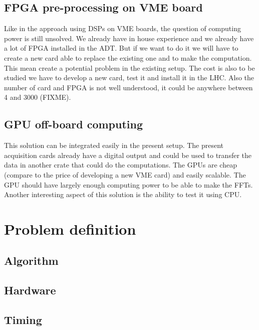 \subsection{FPGA pre-processing on VME board}

Like in the approach using \glspl{DSP} on VME boards, the question of computing 
power is still unsolved. We already have in house experience and we already 
have a lot of \gls{FPGA} installed in the \gls{ADT}. But if we want to do it we 
will have to create a new card able to replace the existing one and to make the 
computation. This mean create a potential problem in the existing setup. The 
cost is also to be studied we have to develop a new card, test it and install 
it in the \gls{LHC}. Also the number of card and FPGA is not well understood,
it could be anywhere between 4 and 3000 (FIXME).

\subsection{GPU off-board computing}

This solution can be integrated easily in the present setup. The present 
acquisition cards already have a digital output and could be used to transfer
the data in another crate that could do the computations. The \glspl{GPU} are
cheap (compare to the price of developing a new \gls{VME} card) and easily
scalable. The \gls{GPU} should have largely enough computing power to be able
to make the \glspl{FFT}. Another interesting aspect of this solution is the 
ability to test it using \gls{CPU}.

\section{Problem definition}

   \subsection{Algorithm}

   \subsection{Hardware}
   
   \subsection{Timing}

